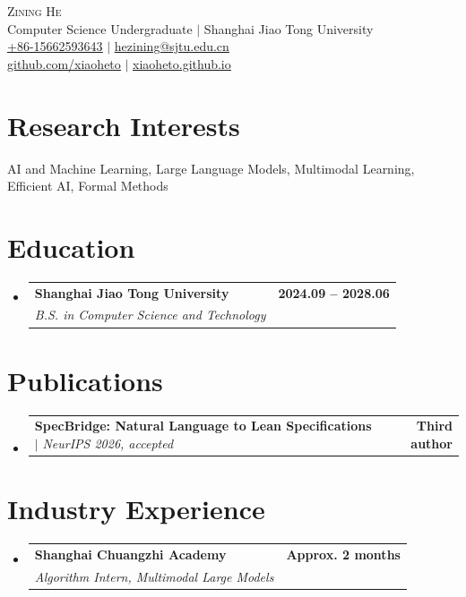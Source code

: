 \documentclass[letterpaper,11pt]{article}
\makeatletter
\newcommand{\resumeSubheading}[4]{
  \vspace{-2pt}\item
    \begin{tabular*}{1.0\textwidth}[t]{l@{\extracolsep{\fill}}r}
      \textbf{\color{cvNavy}#1} & \textbf{\small\color{cvTeal} #2} \\
      \textit{\small\color{cvMuted}#3} & \textit{\small\color{cvMuted} #4} \\
    \end{tabular*}\vspace{-7pt}
}
\newcommand{\resumeProjectHeading}[2]{
    \item
    \begin{tabular*}{1.0\textwidth}{l@{\extracolsep{\fill}}r}
      \small#1 & \textbf{\small\color{cvTeal} #2}\\
    \end{tabular*}\vspace{-7pt}
}
\newcommand{\resumeSubHeadingListStart}{\begin{itemize}[leftmargin=0.0in, label={}]}
\newcommand{\resumeSubHeadingListEnd}{\end{itemize}}
\makeatother
\begin{document}
\begin{center}
    {\Huge \scshape\color{cvNavy} Zining He} \\ \vspace{2pt}
    {\small\color{cvMuted} Computer Science Undergraduate $|$ Shanghai Jiao Tong University} \\ \vspace{4pt}
    \small \href{tel:+8615662593643}{\underline{+86-15662593643}} $|$
    \href{mailto:hezining@sjtu.edu.cn}{\underline{hezining@sjtu.edu.cn}} \\
    \small \href{https://github.com/xiaoheto}{\underline{github.com/xiaoheto}} $|$
    \href{https://xiaoheto.github.io}{\underline{xiaoheto.github.io}}
    \vspace{-8pt}
\end{center}

\section{Research Interests}
\small{AI and Machine Learning, Large Language Models, Multimodal Learning, Efficient AI, Formal Methods}
\vspace{-6pt}

\section{Education}
  \resumeSubHeadingListStart
    \resumeSubheading
      {Shanghai Jiao Tong University}{2024.09 -- 2028.06}
      {B.S. in Computer Science and Technology}{}
  \resumeSubHeadingListEnd

\section{Publications}
  \resumeSubHeadingListStart
    \resumeProjectHeading
      {\textbf{SpecBridge: Natural Language to Lean Specifications} $|$ \emph{NeurIPS 2026, accepted}}{Third author}
  \resumeSubHeadingListEnd

\section{Industry Experience}
  \resumeSubHeadingListStart
    \resumeSubheading
      {Shanghai Chuangzhi Academy}{Approx. 2 months}
      {Algorithm Intern, Multimodal Large Models}{}
  \resumeSubHeadingListEnd
\end{document}
